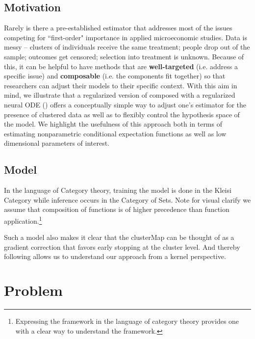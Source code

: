 \documentclass[a4paper,12pt]{article}
\begin{document}
\subsection{Motivation}
Rarely is there a pre-established estimator that addresses most of the issues competing for ``first-order" importance in applied microeconomic studies. Data is  messy -- clusters of individuals receive the same treatment; people drop out of the sample; outcomes get censored; selection into treatment is unknown. Because of this, it can be helpful to have methods that are \textbf{well-targeted} (i.e. address a specific issue) and \textbf{composable} (i.e. the components fit together) so that researchers can adjust their models to their specific context. With this aim in mind, we illustrate that a regularized version of \cite{finn2017model} composed with a regularized neural ODE (\cite{kelly2020learning}) offers a conceptually simple way to adjust one's estimator for the presence of clustered data as well as to flexibly control the hypothesis space of the model. We highlight the usefulness of this approach both in terms of estimating nonparametric conditional expectation functions as well as low dimensional parameters of interest.
\subsection{Model}
In the language of Category theory, training the model is done in the Kleisi Category while inference occurs in the Category of Sets. Note for visual clarify we assume that composition of functions is of higher precedence than function application.\footnote{Expressing the framework in the language of category theory provides one with a clear way to understand the framework.}

Such a model also makes it clear that the clusterMap can be thought of as a gradient correction that favors early stopping at the cluster level. And thereby following \cite{domingos2020every} allows us to understand our approach from a kernel perspective. 
\section{Problem}
\end{document}
